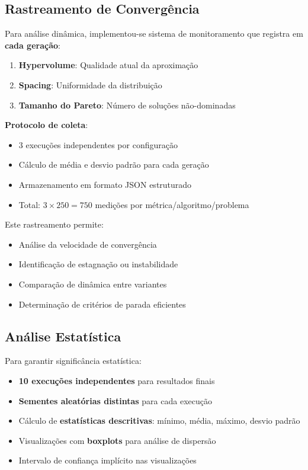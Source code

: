 \subsection{Rastreamento de Convergência}

Para análise dinâmica, implementou-se sistema de monitoramento que registra em \textbf{cada geração}:

\begin{enumerate}
    \item \textbf{Hypervolume}: Qualidade atual da aproximação
    \item \textbf{Spacing}: Uniformidade da distribuição
    \item \textbf{Tamanho do Pareto}: Número de soluções não-dominadas
\end{enumerate}

\textbf{Protocolo de coleta}:
\begin{itemize}
    \item 3 execuções independentes por configuração
    \item Cálculo de média e desvio padrão para cada geração
    \item Armazenamento em formato JSON estruturado
    \item Total: $3 \times 250 = 750$ medições por métrica/algoritmo/problema
\end{itemize}

Este rastreamento permite:
\begin{itemize}
    \item Análise da velocidade de convergência
    \item Identificação de estagnação ou instabilidade
    \item Comparação de dinâmica entre variantes
    \item Determinação de critérios de parada eficientes
\end{itemize}

\subsection{Análise Estatística}

Para garantir significância estatística:

\begin{itemize}
    \item \textbf{10 execuções independentes} para resultados finais
    \item \textbf{Sementes aleatórias distintas} para cada execução
    \item Cálculo de \textbf{estatísticas descritivas}: mínimo, média, máximo, desvio padrão
    \item Visualizações com \textbf{boxplots} para análise de dispersão
    \item Intervalo de confiança implícito nas visualizações
\end{itemize}


